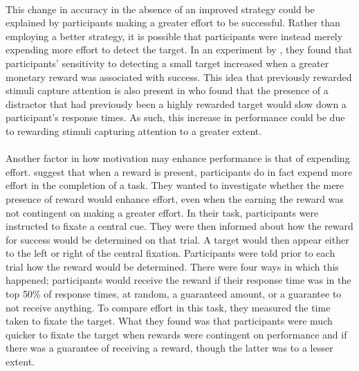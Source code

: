 \documentclass[12pt]{article}
\begin{document}

\paragraph{} This change in accuracy in the absence of an improved strategy could be explained by participants making a greater effort to be successful. Rather than employing a better strategy, it is possible that participants were instead merely expending more effort to detect the target. In an experiment by \cite{engelmann2007motivation}, they found that participants' sensitivity to detecting a small target increased when a greater monetary reward was associated with success. This idea that previously rewarded stimuli capture attention is also present in \cite{miranda2014intrinsic} who found that the presence of a distractor that had previously been a highly rewarded target would slow down a participant's response times. As such, this increase in performance could be due to rewarding stimuli capturing attention to a greater extent. %

\paragraph{} Another factor in how motivation may enhance performance is that of expending effort. \cite{manohar2017distinct} suggest that when a reward is present, participants do in fact expend more effort in the completion of a task. They wanted to investigate whether the mere presence of reward would enhance effort, even when the earning the reward was not contingent on making a greater effort. In their task, participants were instructed to fixate a central cue. They were then informed about how the reward for success would be determined on that trial. A target would then appear either to the left or right of the central fixation. Participants were told prior to each trial how the reward would be determined. There were four ways in which this happened; participants would receive the reward if their response time was in the top 50\% of response times, at random, a guaranteed amount, or a guarantee to not receive anything. To compare effort in this task, they measured the time taken to fixate the target. What they found was that participants were much quicker to fixate the target when rewards were contingent on performance and if there was a guarantee of receiving a reward, though the latter was to a lesser extent.
\end{document}
